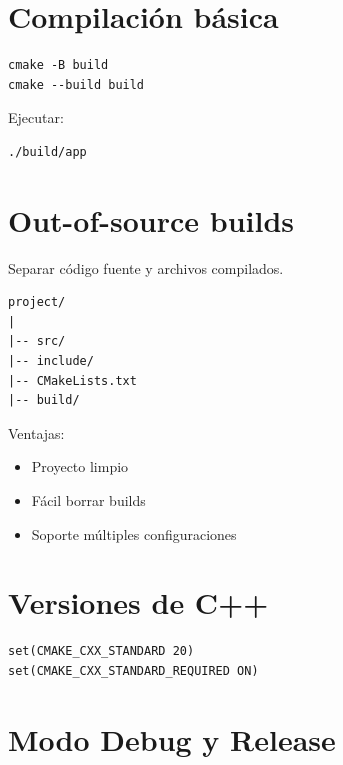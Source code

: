 \documentclass[a4paper,11pt]{article}
\begin{document}

\section*{Compilación básica}

\begin{lstlisting}
cmake -B build
cmake --build build
\end{lstlisting}

Ejecutar:
\begin{lstlisting}
./build/app
\end{lstlisting}


\section*{Out-of-source builds}

Separar código fuente y archivos compilados.

\begin{lstlisting}
project/
|
|-- src/
|-- include/
|-- CMakeLists.txt
|-- build/
\end{lstlisting}

Ventajas:
\begin{itemize}
    \item Proyecto limpio
    \item Fácil borrar builds
    \item Soporte múltiples configuraciones
\end{itemize}


\section*{Versiones de C++}

\begin{lstlisting}
set(CMAKE_CXX_STANDARD 20)
set(CMAKE_CXX_STANDARD_REQUIRED ON)
\end{lstlisting}


\section*{Modo Debug y Release}
\end{document}
